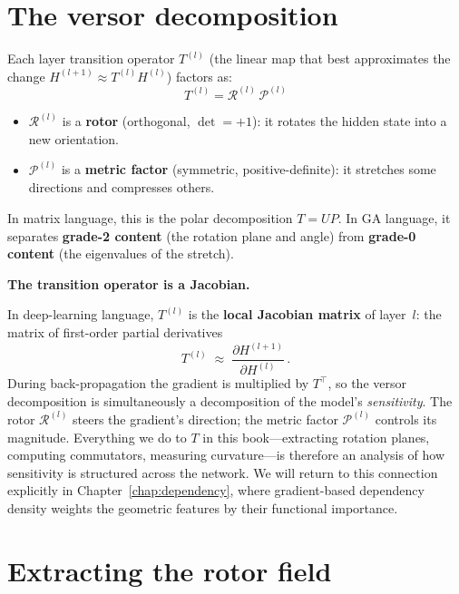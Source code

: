 \documentclass[11pt, twoside, openright]{memoir}
\newcommand{\rotor}[1]{\mathcal{R}^{(#1)}}  %
\newcommand{\metric}[1]{\mathcal{P}^{(#1)}} %
\numberwithin{equation}{chapter}
\begin{document}
\section{The versor decomposition}

Each layer transition operator $T^{(l)}$ (the linear map that best
approximates the change $H^{(l+1)} \approx T^{(l)} H^{(l)}$) factors
as:
\begin{equation}
  T^{(l)} = \rotor{l} \, \metric{l}
\end{equation}

\begin{itemize}[nosep]
\item $\rotor{l}$ is a \textbf{rotor} (orthogonal, $\det = +1$):
  it rotates the hidden state into a new orientation.
\item $\metric{l}$ is a \textbf{metric factor} (symmetric,
  positive-definite): it stretches some directions and compresses others.
\end{itemize}

In matrix language, this is the polar decomposition $T = UP$.  In GA
language, it separates \textbf{grade-2 content} (the rotation plane and
angle) from \textbf{grade-0 content} (the eigenvalues of the stretch).

\begin{keyidea}
\textbf{The transition operator is a Jacobian.}

In deep-learning language, $T^{(l)}$ is the \textbf{local Jacobian
matrix} of layer~$l$: the matrix of first-order partial derivatives
\begin{equation}\label{eq:jacobian}
  T^{(l)} \;\approx\; \frac{\partial H^{(l+1)}}{\partial H^{(l)}}\,.
\end{equation}
During back-propagation the gradient is multiplied by $T^{\top}$, so
the versor decomposition is simultaneously a decomposition of the
model's \emph{sensitivity}.  The rotor $\rotor{l}$ steers the
gradient's direction; the metric factor $\metric{l}$ controls its
magnitude.  Everything we do to $T$ in this book---extracting
rotation planes, computing commutators, measuring curvature---is
therefore an analysis of how sensitivity is structured across the
network.  We will return to this connection explicitly in
Chapter~\ref{chap:dependency}, where gradient-based dependency
density weights the geometric features by their functional
importance.
\end{keyidea}

\section{Extracting the rotor field}
\end{document}
